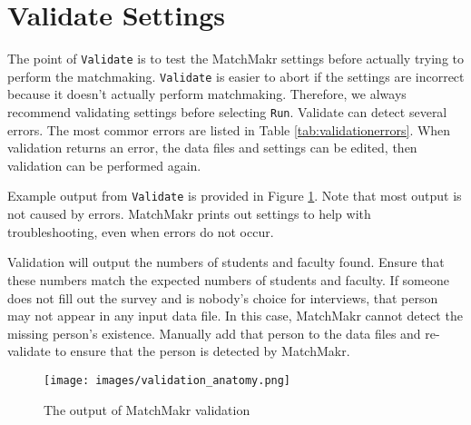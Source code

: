 %
%
\section{Validate Settings}

The point of \texttt{Validate} is to test the MatchMakr settings before actually trying to perform the matchmaking.  \texttt{Validate} is easier to abort if the settings are incorrect because it doesn't actually perform matchmaking.  Therefore, we always recommend validating settings before selecting \texttt{Run}.  Validate can detect several errors.  The most commor errors are listed in Table \ref{tab:validationerrors}.  When validation returns an error, the data files and settings can be edited, then validation can be performed again.

Example output from \texttt{Validate} is provided in Figure \ref{fig:validationanatomy}.  Note that most output is not caused by errors.  MatchMakr prints out settings to help with troubleshooting, even when errors do not occur.

Validation will output the numbers of students and faculty found.  Ensure that these numbers match the expected numbers of students and faculty.  If someone does not fill out the survey and is nobody's choice for interviews, that person may not appear in any input data file.  In this case, MatchMakr cannot detect the missing person's existence.  Manually add that person to the data  files and re-validate to ensure that the person is detected by MatchMakr.


%
%
\begin{figure}
	\centering
	\texttt{[image: images/validation\_anatomy.png]}
	\caption{\label{fig:validationanatomy} The output of MatchMakr validation}
\end{figure}


